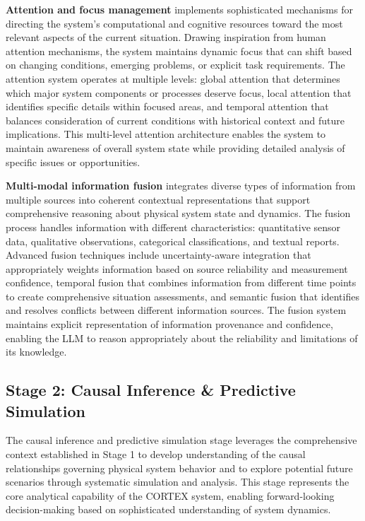 \textbf{Attention and focus management} implements sophisticated mechanisms for directing the system's computational and cognitive resources toward the most relevant aspects of the current situation. Drawing inspiration from human attention mechanisms, the system maintains dynamic focus that can shift based on changing conditions, emerging problems, or explicit task requirements. The attention system operates at multiple levels: global attention that determines which major system components or processes deserve focus, local attention that identifies specific details within focused areas, and temporal attention that balances consideration of current conditions with historical context and future implications. This multi-level attention architecture enables the system to maintain awareness of overall system state while providing detailed analysis of specific issues or opportunities.

\textbf{Multi-modal information fusion} integrates diverse types of information from multiple sources into coherent contextual representations that support comprehensive reasoning about physical system state and dynamics. The fusion process handles information with different characteristics: quantitative sensor data, qualitative observations, categorical classifications, and textual reports. Advanced fusion techniques include uncertainty-aware integration that appropriately weights information based on source reliability and measurement confidence, temporal fusion that combines information from different time points to create comprehensive situation assessments, and semantic fusion that identifies and resolves conflicts between different information sources. The fusion system maintains explicit representation of information provenance and confidence, enabling the LLM to reason appropriately about the reliability and limitations of its knowledge.

\subsection{Stage 2: Causal Inference \& Predictive Simulation}

The causal inference and predictive simulation stage leverages the comprehensive context established in Stage 1 to develop understanding of the causal relationships governing physical system behavior and to explore potential future scenarios through systematic simulation and analysis. This stage represents the core analytical capability of the CORTEX system, enabling forward-looking decision-making based on sophisticated understanding of system dynamics.

